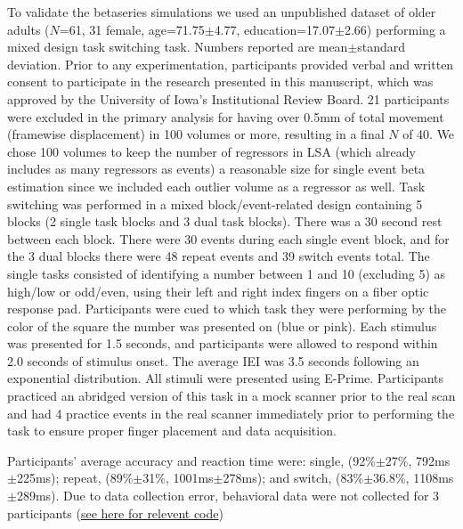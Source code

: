 \documentclass[phd,appendix,figures]{uithesis}
\begin{document}
To validate the betaseries simulations we used an unpublished dataset
of older adults ($N$=61, 31 female, age=71.75$\pm$4.77, education=17.07$\pm$2.66)
performing a mixed design task switching task.
Numbers reported are mean$\pm$standard deviation.
Prior to any experimentation, participants provided verbal and written consent
to participate in the research presented in this manuscript, which was approved
by the University of Iowa's Institutional Review Board.
21 participants were excluded in the primary analysis for having over
0.5mm of total movement (framewise displacement) in 100 volumes or more,
resulting in a final $N$ of 40.
We chose 100 volumes to keep the number of regressors in LSA
(which already includes as many regressors as events) a reasonable size
for single event beta estimation since we included each outlier volume
as a regressor as well.
Task switching was performed in a mixed block/event-related design containing
5 blocks (2 single task blocks and 3 dual task blocks).
There was a 30 second rest between each block.
There were 30 events during each single event block,
and for the 3 dual blocks there were 48 repeat events and 39 switch events total.
The single tasks consisted of identifying a number between
1 and 10 (excluding 5) as high/low or odd/even, using their left and right index fingers
on a fiber optic response pad.
Participants were cued to which task they were performing by the color of the square
the number was presented on (blue or pink).
Each stimulus was presented for 1.5 seconds, and participants were allowed
to respond within 2.0 seconds of stimulus onset.
The average IEI was 3.5 seconds following an exponential distribution.
All stimuli were presented using E-Prime.
Participants practiced an abridged version of this task in a mock scanner
prior to the real scan and had 4 practice events in the real scanner immediately
prior to performing the task to ensure proper finger placement and data acquisition.

Participants' average accuracy and reaction time were:
single, (92\%$\pm$27\%, 792ms$\pm$225ms); repeat, (89\%$\pm$31\%, 1001ms$\pm$278ms);
and switch, (83\%$\pm$36.8\%, 1108ms$\pm$289ms).
Due to data collection error, behavioral data were not collected for 3 participants
(\href{https://github.com/jdkent/BetaSeriesRealDataAnalysis/blob/b18b44321edf7b662a1e5ea635f64452c8d3644c/summarizeBehavior/summarize_behavior.ipynb}{see here for relevent code})
\end{document}
